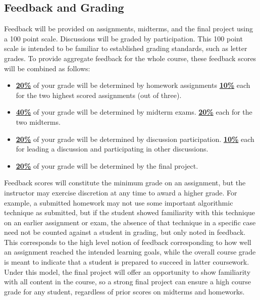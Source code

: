 \documentclass[11pt]{article}
\begin{document}
\subsection*{Feedback and Grading}
Feedback will be provided on assignments, midterms, and the final project using a 100 point scale.
Discussions will be graded by participation.
This 100 point scale is intended to be familiar to established grading standards, such as letter grades. To provide aggregate feedback for the whole course, these feedback scores will be combined as follows:
\begin{itemize}
	\item \underline{\textbf{20\%}} of your grade will be determined by homework assignments
	\subitem \underline{\textbf{10\%}} each for the two highest scored assignments (out of three).
	\item \underline{\textbf{40\%}} of your grade will be determined by midterm exams.
	\subitem \underline{\textbf{20\%}} each for the two midterms.
	\item \underline{\textbf{20\%}} of your grade will be determined by discussion participation.
	\subitem \underline{\textbf{10\%}} each for leading a discussion and participating in other discussions.
	\item \underline{\textbf{20\%}} of your grade will be determined by the final project.
\end{itemize}

\noindent Feedback scores will constitute the minimum grade on an assignment, but the instructor
may exercise discretion at any time to award a higher grade. For example, a submitted homework
may not use some important algorithmic technique as submitted, but if the student showed familiarity
with this technique on an earlier assignment or exam, the absence of that technique in a specific
case need not be counted against a student in grading, but only noted in feedback. This corresponds to the high level notion of feedback corresponding to how well an assignment reached the intended learning goals, while the overall course grade is meant to indicate that a student is prepared to succeed in latter coursework. Under this model, the final project will offer an opportunity to show familiarity with all content in the course, so a strong final project can ensure a high course grade
for any student, regardless of prior scores on midterms and homeworks.


\end{document}
